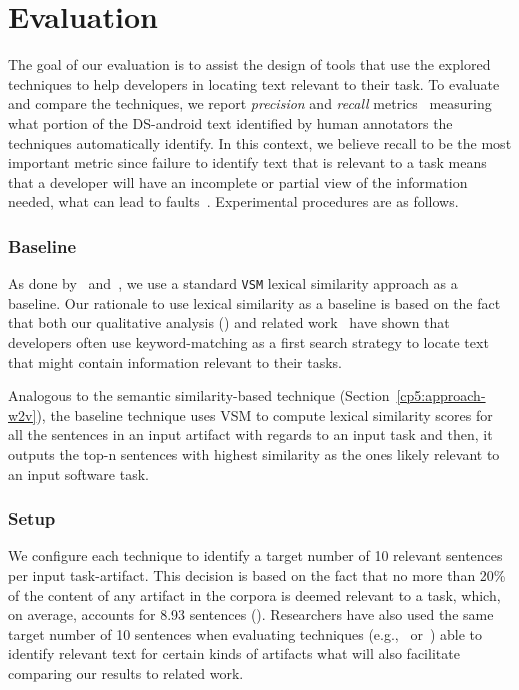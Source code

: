 \clearpage

\section{Evaluation}
\label{cp5:evaluation}



The goal of our evaluation is to assist the design of tools that use the explored techniques to help developers in locating text relevant to their task. 
To evaluate and compare the techniques,
we report \textit{precision} and \textit{recall} metrics~\cite{manning2010IR} measuring what portion of the \acs{DS-android} text identified by human annotators the techniques automatically identify.
In this context, we believe recall to be the most important metric since failure to identify text that is relevant to a task means that a developer will have an incomplete or partial view of the information needed,
what can lead to faults~\cite{Murphy2005}.
Experimental procedures are as follows.



\subsubsection{Baseline}


As done by~\cite{Lin2021} and~\cite{Ye2016}, we use a standard \texttt{VSM} lexical similarity approach as a baseline. Our rationale to use 
lexical similarity as a baseline is based on the fact that 
both our qualitative analysis () and
related work~\cite{Ko2006a, Freund2015} have shown that developers often use keyword-matching as a first search strategy to locate text that might contain information relevant to their tasks.


Analogous to the semantic similarity-based technique (Section~\ref{cp5:approach-w2v}), the baseline technique uses VSM to compute lexical similarity scores 
for all the sentences in an input artifact with regards to an input task and then, it outputs the top-n sentences with highest similarity as the ones likely relevant to an input software task.




\subsubsection{Setup}



We configure each technique to identify a target number of 10 relevant sentences per input task-artifact.
This decision is based on the fact that 
no more than 20\% of the content of any artifact in the corpora is deemed relevant to a task, which, on average, accounts for 8.93 sentences ().
Researchers have also used the same target number of 10 sentences when evaluating techniques  (e.g.,~\cite{Xu2017} or~\cite{Lotufo2012}) able to identify relevant text for certain kinds of artifacts
what will also facilitate comparing our results to related work.


